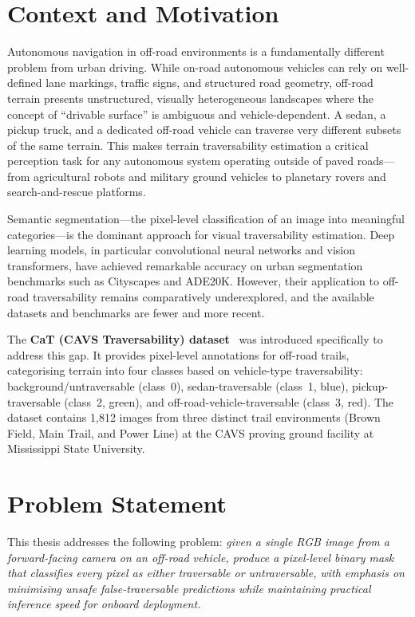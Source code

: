 \documentclass[12pt,a4paper]{report}
\begin{document}
\section{Context and Motivation}

Autonomous navigation in off-road environments is a fundamentally different problem from urban driving.
While on-road autonomous vehicles can rely on well-defined lane markings, traffic signs, and structured road geometry, off-road terrain presents unstructured, visually heterogeneous landscapes where the concept of ``drivable surface'' is ambiguous and vehicle-dependent.
A sedan, a pickup truck, and a dedicated off-road vehicle can traverse very different subsets of the same terrain.
This makes terrain traversability estimation a critical perception task for any autonomous system operating outside of paved roads---from agricultural robots and military ground vehicles to planetary rovers and search-and-rescue platforms.

Semantic segmentation---the pixel-level classification of an image into meaningful categories---is the dominant approach for visual traversability estimation.
Deep learning models, in particular convolutional neural networks and vision transformers, have achieved remarkable accuracy on urban segmentation benchmarks such as Cityscapes and ADE20K.
However, their application to off-road traversability remains comparatively underexplored, and the available datasets and benchmarks are fewer and more recent.

The \textbf{CaT (CAVS Traversability) dataset}~\cite{sharma2022cat} was introduced specifically to address this gap.
It provides pixel-level annotations for off-road trails, categorising terrain into four classes based on vehicle-type traversability: background/untraversable (class~0), sedan-traversable (class~1, blue), pickup-traversable (class~2, green), and off-road-vehicle-traversable (class~3, red).
The dataset contains 1{,}812 images from three distinct trail environments (Brown Field, Main Trail, and Power Line) at the CAVS proving ground facility at Mississippi State University.

\section{Problem Statement}

This thesis addresses the following problem: \emph{given a single RGB image from a forward-facing camera on an off-road vehicle, produce a pixel-level binary mask that classifies every pixel as either traversable or untraversable, with emphasis on minimising unsafe false-traversable predictions while maintaining practical inference speed for onboard deployment.}
\end{document}
